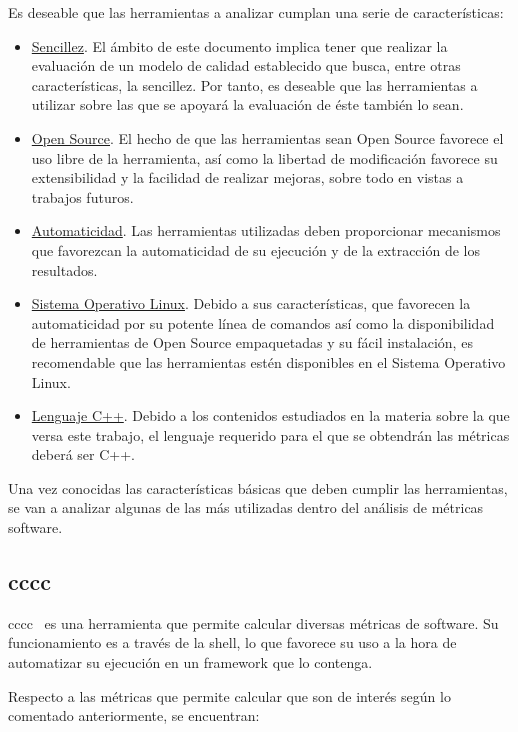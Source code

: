 \documentclass[11pt]{article}
\begin{document}
Es deseable que las herramientas a analizar cumplan una serie de características:

\begin{itemize}
\item{\underline{Sencillez}}. El ámbito de este documento implica tener que realizar la evaluación de un modelo de calidad establecido que busca, entre otras características, la sencillez. Por tanto, es deseable que las herramientas a utilizar sobre las que se apoyará la evaluación de éste también lo sean.
\item{\underline{Open Source}}. El hecho de que las herramientas sean Open Source favorece el uso libre de la herramienta, así como la libertad de modificación favorece su extensibilidad y la facilidad de realizar mejoras, sobre todo en vistas a trabajos futuros.
\item{\underline{Automaticidad}}. Las herramientas utilizadas deben proporcionar mecanismos que favorezcan la automaticidad de su ejecución y de la extracción de los resultados.
\item{\underline{Sistema Operativo Linux}}. Debido a sus características, que favorecen la automaticidad por su potente línea de comandos así como la disponibilidad de herramientas de Open Source empaquetadas y su fácil instalación, es recomendable que las herramientas estén disponibles en el Sistema Operativo Linux.
\item{\underline{Lenguaje C++}}. Debido a los contenidos estudiados en la materia sobre la que versa este trabajo, el lenguaje requerido para el que se obtendrán las métricas deberá ser C++.
\end{itemize}

Una vez conocidas las características básicas que deben cumplir las herramientas, se van a analizar algunas de las más utilizadas dentro del análisis de métricas software.

\subsection{cccc}

cccc~\cite{metrictools:cccc} es una herramienta que permite calcular diversas métricas de software. Su funcionamiento es a través de la shell, lo que favorece su uso a la hora de automatizar su ejecución en un framework que lo contenga.

Respecto a las métricas que permite calcular que son de interés según lo comentado anteriormente, se encuentran:
\end{document}
